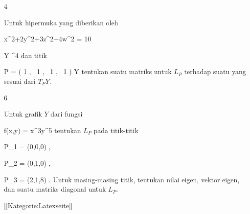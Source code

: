 {4}
{

Untuk hipermuka yang diberikan oleh

\mavergleichskettedisp
{\vergleichskette
{ x^2+2y^2+3z^2+4w^2
}
{ =} { 10
}
{ } {
}
{ } {
}
{ } {
}
}
{}{}{}

\mavergleichskette
{\vergleichskette
{ Y
}
{ \subseteq }{ \R^4
}
{  }{
}
{    }{
}
{   }{
}
}
{}{}{}
dan titik

\mavergleichskettedisp
{\vergleichskette
{ P
}
{ =} { \left(  1  , \,   1  , \,   1 , \,   1                \right)
}
{ \in} { Y
}
{ } {
}
{ } {
}
}
{}{}{}
tentukan suatu matriks untuk
$L_P$ terhadap suatu
yang sesuai dari
$T_PY$.

}
{} {}

{6}
{

Untuk grafik $Y$ dari fungsi

\mavergleichskettedisp
{\vergleichskette
{ f(x,y)
}
{ =} { x^3y^5
}
{ } {
}
{ } {
}
{ } {
}
}
{}{}{}
tentukan
$L_P$ pada titik-titik

\mavergleichskette
{\vergleichskette
{ P_1
}
{ = }{ (0,0,0)
}
{  }{
}
{    }{
}
{   }{
}
}
{}{}{,}

\mavergleichskette
{\vergleichskette
{ P_2
}
{ = }{ (0,1,0)
}
{  }{
}
{    }{
}
{   }{
}
}
{}{}{,}

\mavergleichskette
{\vergleichskette
{ P_3
}
{ = }{ (2,1,8)
}
{  }{
}
{    }{
}
{   }{
}
}
{}{}{.}
Untuk masing-masing titik, tentukan nilai eigen, vektor eigen, dan suatu matriks diagonal untuk $L_P$.

}
{} {}

 [[Kategorie:Latexseite]]

